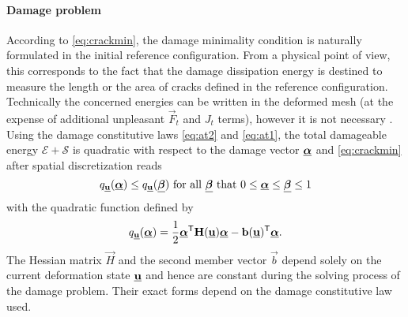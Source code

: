 \paragraph{Damage problem} According to \eqref{eq:crackmin}, the damage minimality condition 	is naturally formulated in the initial reference configuration. From a physical point of view, this corresponds to the fact that the damage dissipation energy is destined to measure the length or the area of cracks defined in the reference configuration. Technically the concerned energies can be written in the deformed mesh (at the expense of additional unpleasant $\vec{F}_t$ and $J_t$ terms), however it is not necessary \cite{PieroLancioniMarch:2007}. Using the damage constitutive laws \eqref{eq:at2} and \eqref{eq:at1}, the total damageable energy $\mathcal{E}+\mathcal{S}$ is quadratic with respect to the damage vector $\dvec$ and \eqref{eq:crackmin} after spatial discretization reads 
\begin{equation} \label{eq:crackdis}
q_{\uvec}(\dvec)\leq q_{\uvec}(\underline{\vec{\beta}})\text{ for all $\underline{\vec{\beta}}$ that $0\leq\dvec\leq\underline{\vec{\beta}}\leq 1$}
\end{equation}
with the quadratic function defined by
\begin{equation} \label{eq:Hb}
q_{\uvec}(\dvec)=\frac{1}{2}\dvec^\mT\vec{H}(\uvec)\dvec-\vec{b}(\uvec)^\mT\dvec.
\end{equation}
The Hessian matrix $\vec{H}$ and the second member vector $\vec{b}$ depend solely on the current deformation state $\uvec$ and hence are constant during the solving process of the damage problem. Their exact forms depend on the damage constitutive law used.

